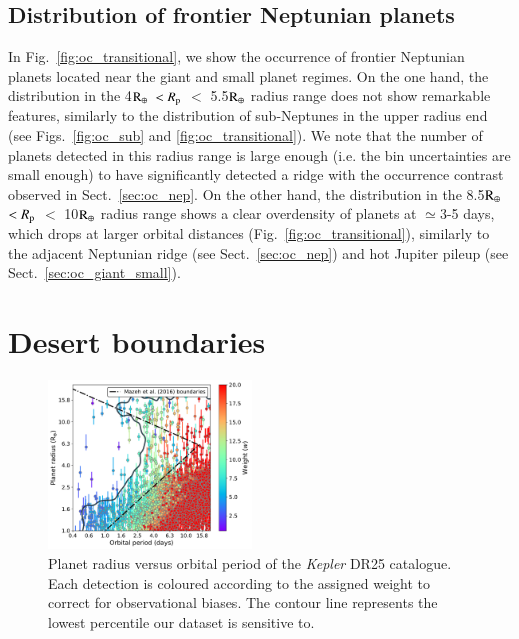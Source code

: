 \documentclass[]{aa}
\begin{document}
\subsection{Distribution of frontier Neptunian planets}
\label{oc:trans}

In Fig.~\ref{fig:oc_transitional}, we show the occurrence of frontier Neptunian planets located near the giant and small
planet regimes. On the one hand, the distribution in the 4$\rm R_{\oplus}$ $<R_{\rm p}$ $<$ 5.5$\rm R_{\oplus}$ radius range does not show remarkable features, similarly to the distribution of sub-Neptunes in the upper radius end (see Figs.~\ref{fig:oc_sub} and \ref{fig:oc_transitional}). We note that the number of planets detected in this radius range is large enough (i.e. the bin uncertainties are small enough) to have significantly detected a ridge with the occurrence contrast observed in Sect.~\ref{sec:oc_nep}.  On the other hand, the distribution in the 8.5$\rm R_{\oplus}$ $<R_{\rm p}$ $<$ 10$\rm R_{\oplus}$ radius range shows a clear overdensity of planets at $\simeq$3-5 days, which drops at larger orbital distances (Fig.~\ref{fig:oc_transitional}), similarly to the adjacent Neptunian ridge (see Sect.~\ref{sec:oc_nep}) and hot Jupiter pileup (see Sect.~\ref{sec:oc_giant_small}).  


\section{Desert boundaries}
\label{sec:boundaries}

\begin{figure}
    \centering
    \includegraphics[width=0.48\textwidth]{boundaries.pdf}
    \caption{Planet radius versus orbital period of the \textit{Kepler} DR25 catalogue. Each detection is coloured according to the assigned weight to correct for observational biases. The contour line represents the lowest percentile our dataset is sensitive to. }
    \label{fig:our_desert}
\end{figure}
\end{document}
